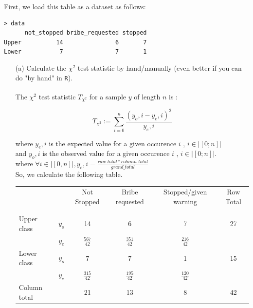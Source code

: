 \documentclass[12pt,letterpaper]{article}
\begin{document}
First, we load this table as a dataset as follows:

\vspace{.5cm}

  
\begin{verbatim}
> data
      not_stopped bribe_requested stopped
Upper          14               6       7
Lower           7               7       1
\end{verbatim}


\vspace{1cm}

\begin{enumerate}
	
	\item [(a)]
	Calculate the $\chi^2$ test statistic by hand/manually (even better if you can do "by hand" in \texttt{R}).\\
	\\
	The $\chi^2$ test statistic $T_{\chi^2}$ for a sample $y$ of length $n$ is :

	\begin{equation}
		T_{\chi^2}:= \sum_{i=0}^{n}\frac{(y_o,i - y_e,i)^2}{y_e,i}
	\end{equation}

	where $y_e,i$ is the expected value for a given occurence $i$ , $i \in  |[0;n]|$ \\
	and $y_o,i$ is the observed value for a given occurence $i$ , $i \in  |[0;n]|$.\\

	where $\forall i \in |[0,n]|,  y_e,i = \frac{raw\_total*column\_total}{grand\_total}$\\
	
	So, we calculate the following table.
	\newpage
	\begin{table}[h!]
		\centering
		\begin{tabular}{ll | c c c c }
			& & Not Stopped & Bribe requested & Stopped/given warning & Row Total\\
			\\[-1.8ex] 
			\hline \\[-1.8ex]
			Upper class & $y_o$  & 14 & 6 & 7 & 27\\
					& $y_e$  & $\frac{567}{42}$ & $\frac{351}{42}$ & $\frac{216}{42}$  & \\
			Lower class &  $y_o$ & 7 & 7 & 1 &15\\
					& $y_e$  & $\frac{315}{42}$ & $\frac{195}{42}$ & $\frac{120}{42} $ & \\
			Column total &         &21&13&8&42\\
			\hline
		\end{tabular}
	\end{table}		


\end{enumerate}
\end{document}
